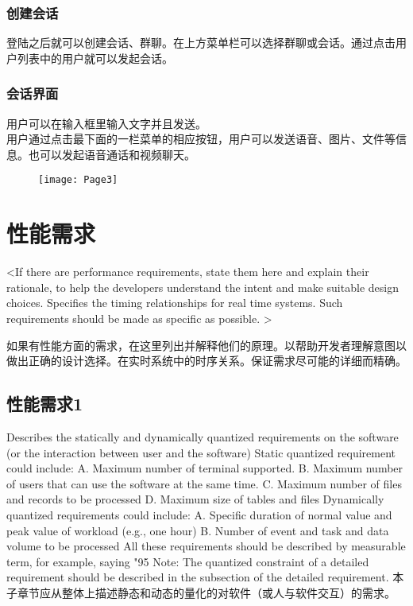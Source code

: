 \subsubsection{创建会话}
  登陆之后就可以创建会话、群聊。在上方菜单栏可以选择群聊或会话。通过点击用户列表中的用户就可以发起会话。
\subsubsection{会话界面}
  用户可以在输入框里输入文字并且发送。\\
  用户通过点击最下面的一栏菜单的相应按钮，用户可以发送语音、图片、文件等信息。也可以发起语音通话和视频聊天。
  \begin{figure}[!h]
  	\centering
	\texttt{[image: Page3]}
	\label{fig:noted-figure}
  \end{figure}

\section{性能需求}
\iffalse
<If there are performance requirements, state them here and explain their rationale, to help the developers understand the intent and make suitable design choices. Specifies the timing relationships for real time systems. Such requirements should be made as specific as possible. >

如果有性能方面的需求，在这里列出并解释他们的原理。以帮助开发者理解意图以做出正确的设计选择。在实时系统中的时序关系。保证需求尽可能的详细而精确。

\subsection{性能需求1}
Describes the statically and dynamically quantized requirements on the software (or the interaction between user and the software)
Static quantized requirement could include:
A. Maximum number of terminal supported.
B. Maximum number of users that can use the software at the same time.
C. Maximum number of files and records to be processed
D. Maximum size of  tables and files
Dynamically quantized requirements could include:
A. Specific duration of normal value and peak value of workload (e.g., one hour)
B. Number of event and task and data volume to be processed
All these requirements should be described by measurable term, for example, saying "95%
Note: The quantized constraint of a detailed requirement should be described in the subsection of the detailed requirement.
本子章节应从整体上描述静态和动态的量化的对软件（或人与软件交互）的需求。

